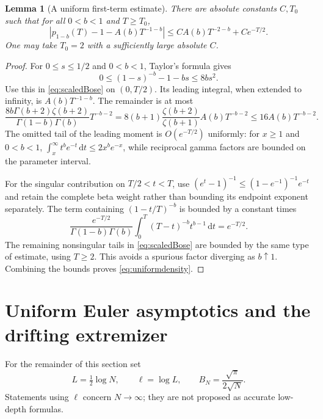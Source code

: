 \documentclass[11pt]{article}
\numberwithin{equation}{section}
\newtheorem{lemma}[theorem]{Lemma}
\theoremstyle{definition}\newtheorem{definition}[theorem]{Definition}
\theoremstyle{remark}\newtheorem{remark}[theorem]{Remark}
\newcommand{\dd}{\,\mathrm d}
\begin{document}
\begin{lemma}[A uniform first-term estimate]\label{lem:uniformdensity}
There are absolute constants $C,T_0$ such that for all $0<b<1$ and
$T\ge T_0$,
\begin{equation}\label{eq:uniformdensity}
 \left|p_{1-b}(T)-1-A(b)T^{-1-b}\right|
 \le C A(b)T^{-2-b}+C e^{-T/2}.
\end{equation}
One may take $T_0=2$ with a sufficiently large absolute $C$.
\end{lemma}
\begin{proof}
For $0\le s\le1/2$ and $0<b<1$, Taylor's formula gives
\[
 0\le(1-s)^{-b}-1-bs\le8bs^2.
\]
Use this in \eqref{eq:scaledBose} on $(0,T/2)$.
Its leading integral, when extended to infinity, is
$A(b)T^{-1-b}$. The remainder is at most
\[
 \frac{8b\Gamma(b+2)\zeta(b+2)}
 {\Gamma(1-b)\Gamma(b)}T^{-b-2}
 =8(b+1)\frac{\zeta(b+2)}{\zeta(b+1)}A(b)T^{-b-2}
 \le16A(b)T^{-b-2}.
\]
The omitted tail of the leading moment is $O(e^{-T/2})$ uniformly:
for $x\ge1$ and $0<b<1$,
$\int_x^\infty t^be^{-t}\dd t\le2x^be^{-x}$, while reciprocal
gamma factors are bounded on the parameter interval.

For the singular contribution on $T/2<t<T$, use
$(e^t-1)^{-1}\le(1-e^{-1})^{-1}e^{-t}$ and retain the complete beta
weight rather than bounding its endpoint exponent separately. The
term containing $(1-t/T)^{-b}$ is bounded by a constant times
\[
 \frac{e^{-T/2}}{\Gamma(1-b)\Gamma(b)}
 \int_0^T(T-t)^{-b}t^{b-1}\dd t=e^{-T/2}.
\]
The remaining nonsingular tails in \eqref{eq:scaledBose} are bounded
by the same type of estimate, using $T\ge2$. This avoids a spurious
factor diverging as $b\uparrow1$. Combining the bounds proves
\eqref{eq:uniformdensity}.
\end{proof}

\section{Uniform Euler asymptotics and the drifting extremizer}
\label{sec:optimization}
For the remainder of this section set
\begin{equation}\label{eq:Lell}
 L=\tfrac12\log N,\qquad \ell=\log L,\qquad
 B_N=\frac{\sqrt\pi}{2\sqrt N}.
\end{equation}
Statements using $\ell$ concern $N\to\infty$; they are not proposed as
accurate low-depth formulas.
\end{document}
